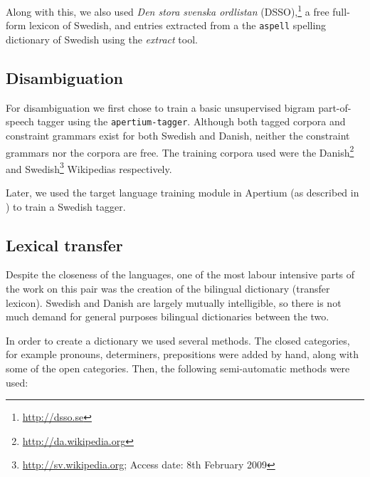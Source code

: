\documentclass[11pt]{article}
\begin{document}
Along with this, we also used \emph{Den stora svenska ordlistan} (DSSO),\footnote{\url{http://dsso.se}} 
a free full-form lexicon of Swedish, and entries extracted from a the {\tt\small aspell} spelling
dictionary of Swedish using the \emph{extract} tool.

\subsection{Disambiguation}


For disambiguation we first chose to train a basic unsupervised bigram part-of-speech tagger
using the {\tt\small apertium-tagger}. Although both tagged corpora and constraint
grammars exist for both Swedish and Danish, neither the constraint grammars
nor the corpora are free. The training corpora used were the 
Danish\footnote{\url{http://da.wikipedia.org}} and Swedish\footnote{\url{http://sv.wikipedia.org}; 
Access date: 8th February 2009} Wikipedias respectively.

Later, we used the target language training module in Apertium (as described in \cite{sanchez2008})
to train a Swedish tagger.

\subsection{Lexical transfer}

Despite the closeness of the languages, one of the most labour intensive parts of 
the work on this pair was the creation of the bilingual dictionary (transfer 
lexicon). Swedish and Danish are largely mutually intelligible, so there is not 
much demand for general purposes bilingual dictionaries between the two.

In order to create a dictionary we used several methods. The closed categories, 
for example pronouns, determiners, prepositions were added by hand, along with some 
of the open categories. Then, the following semi-automatic methods were used:
\end{document}
